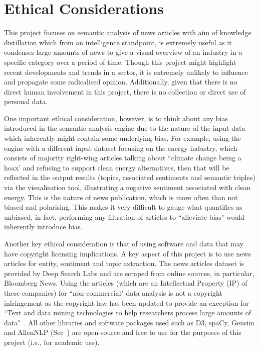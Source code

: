 
\section{Ethical Considerations} 
This project focuses on semantic analysis of news articles with aim of knowledge distillation which from an intelligence standpoint, is extremely useful as it condenses large amounts of news to give a visual overview of an industry in a specific category over a period of time. Though this project might highlight recent developments and trends in a sector, it is extremely unlikely to influence and propagate some radicalised opinion. Additionally, given that there is no direct human involvement in this project, there is no collection or direct use of personal data.

One important ethical consideration, however, is to think about any bias introduced in the semantic analysis engine due to the nature of the input data which inherently might contain some underlying bias. For example, using the engine with a different input dataset focusing on the energy industry, which consists of majority right-wing articles talking about ``climate change being a hoax' and refusing to support clean energy alternatives, then that will be reflected in the output results (topics, associated sentiments and semantic triples) via the visualisation tool, illustrating a negative sentiment associated with clean energy. This is the nature of news publication, which is more often than not biased and polarising. This makes it very difficult to gauge what quantifies as unbiased, in fact, performing any filtration of articles to ``alleviate bias" would inherently introduce bias.

Another key ethical consideration is that of using software and data that may have copyright licensing implications. A key aspect of this project is to use news articles for entity, sentiment and topic extraction. The news articles dataset is provided by Deep Search Labs and are scraped from online sources, in particular, Bloomberg News. Using the articles (which are an Intellectual Property (IP) of these companies) for ``non-commercial" data analysis is not a copyright infringement as the copyright law has been updated to provide an exception for ``Text and data mining technologies to help researchers process large amounts of data"~\cite{exceptions_to_copyright}. All other libraries and software packages used such as D3, spaCy, Gensim and AllenNLP (See~) are open-source and free to use for the purposes of this project (i.e., for academic use).